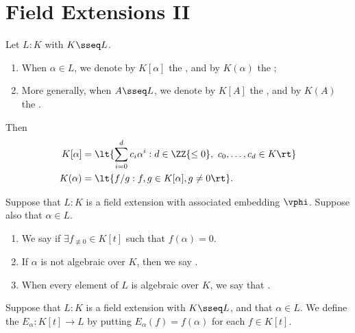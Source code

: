 \documentclass[a4paper]{article}
\begin{document}
\section{Field Extensions II}
\begin{tdefinition}
  Let \( L:K \) with \( K\sseq L \).
  \begin{enumerate}[label=(\roman*)]
    \item When \( \alpha\in L \), we denote by \( K[\alpha] \) the , and by \( K(\alpha) \) the ;
    \item More generally, when \( A\sseq L \), we denote by \( K[A] \) the , and by \( K(A) \) the .
  \end{enumerate}
  Then \begin{align*}
    K[\alpha] &= \lt\{ \sum_{i=0}^{d}c_i\alpha^i : d\in \ZZ{\leq 0},\ c_0,\ldots,c_d\in K \rt\} \\
    K(\alpha) &= \lt\{ f/g : f,g\in K[\alpha], g\neq 0 \rt\}.
  \end{align*}
\end{tdefinition}

\begin{tdefinition}
  Suppose that \( L: K \) is a field extension with associated embedding \( \vphi \).
  Suppose also that \( \alpha\in L \). \begin{enumerate}[label=(\roman*)]
    \item We say  if \( \exists f_{\not\equiv 0} \in K[t] \) such that \( f(\alpha)=0 \).
    \item If \( \alpha \) is not algebraic over \( K \), then we say .
    \item When every element of \( L \) is algebraic over \( K \), we say that .
  \end{enumerate}
\end{tdefinition}

\begin{tdefinition}
  Suppose that \( L: K \) is a field extension with \( K \sseq L \), and that \( \alpha\in L \).
  We define the  \( E_\alpha : K[t] \to L \) by putting \( E_\alpha(f) = f(\alpha) \) for each \( f \in K[t] \).
\end{tdefinition}
\end{document}
